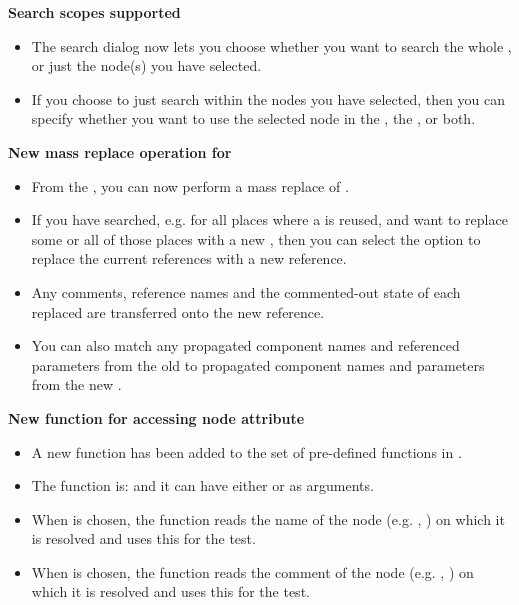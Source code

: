 \textbf{Search scopes supported}
\begin{itemize}
\item The search dialog now lets you choose whether you want to search the whole \gdproject{}, or just the node(s) you have selected. 
\item If you choose to just search within the nodes you have selected, then you can specify whether you want to use the selected node in the \gdtestsuitebrowser{}, the \gdtestcasebrowser{}, or both. 
\end{itemize}

\textbf{New mass replace operation for \gdcases{}}
\begin{itemize}
\item From the \gdsearchresultview{}, you can now perform a mass replace of \gdcases{}. 
\item If you have searched, e.g. for all places where a \gdcase{} is reused, and want to replace some or all of those places with a new \gdcase{}, then you can select the option to replace the current \gdcase{} references with a new \gdcase{} reference. 
\item Any comments, \gdcase{} reference names and the commented-out state of each replaced \gdcase{} are transferred onto the new \gdcase{} reference. 
\item You can also match any propagated component names and referenced parameters from the old \gdcase{} to propagated component names and parameters from the new \gdcase{}. 
\end{itemize}

\textbf{New function for accessing node attribute}
\begin{itemize}
\item A new function has been added to the set of pre-defined functions in \app{}.
\item The function is:  and it can have either  or  as arguments.
\item When  is chosen, the function reads the name of the node (e.g. \gdcase{}, \gdstep{}) on which it is resolved and uses this for the test.
\item  When  is chosen, the function reads the comment of the node (e.g. \gdcase{}, \gdstep{}) on which it is resolved and uses this for the test.
\end{itemize}

